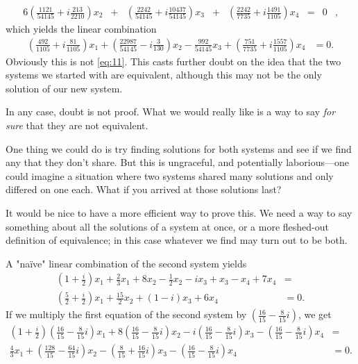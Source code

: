 \documentclass[12pt]{article}
\begin{document}
\begin{enumerate}
\begin{alignat*}{6}
        (\frac{1121}{54145} + i\frac{213}{2210})x_2 & {}+{} &
        (\frac{2242}{54145} + i\frac{10437}{54145})x_3 & {}+{} &
        (\frac{2242}{7735}+i\frac{1491}{1105})x_4 & {}={}  & 0 &,
      \end{alignat*}
      which yields the linear combination
      \begin{align*}
        (\frac{492}{1105} + i\frac{81}{1105})x_1
        + (\frac{22987}{54145} - i\frac{3}{130})x_2
        - \frac{992}{54145}x_3
        + (\frac{751}{7735} + i\frac{1557}{1105})x_4
        &= 0.
      \end{align*}
      Obviously this is not \eqref{eq:11}. This casts further
      doubt on the idea that the two systems we started with are
      equivalent, although this may not be the only solution of
      our new system.

      In any case, doubt is not proof. What we would really like
      is a way to say \textit{for sure} that they are not
      equivalent.

      One thing we could do is try finding solutions for both
      systems and see if we find any that they don't share. But
      this is ungraceful, and potentially laborious—one could
      imagine a situation where two systems shared many solutions
      and only differed on one each. What if you arrived at those
      solutions last?

      It would be nice to have a more efficient way to prove
      this. We need a way to say something about all the
      solutions of a system at once, or a more fleshed-out
      definition of equivalence; in this case whatever we find
      may turn out to be both.

      A "naïve" linear combination of the second system yields
      \begin{align*}
        (1 + \frac{i}{2})x_1 + \frac{2}{3}x_1 + 8x_2 - \frac{1}{2}x_2 - ix_3 + x_3 - x_4 + 7x_4 &=\\
        (\frac{5}{2} + \frac{i}{2})x_1 + \frac{15}{2}x_2 + (1 - i)x_3 + 6x_4 &= 0.
      \end{align*}
      If we multiply the first equation of the second system by
      $(\frac{16}{15} - \frac{8}{15}i)$, we get
      \begin{align*}
        (1 + \frac{i}{2})(\frac{16}{15} - \frac{8}{15}i)x_1 + 8(\frac{16}{15} - \frac{8}{15}i)x_2 - i(\frac{16}{15} - \frac{8}{15}i)x_3 - (\frac{16}{15} - \frac{8}{15}i)x_4 &=\\
        \frac{4}{3}x_1 + (\frac{128}{15} - \frac{64}{15}i)x_2 -
        (\frac{8}{15} + \frac{16}{15}i)x_3 - (\frac{16}{15} -
        \frac{8}{15}i)x_4 &= 0.
      \end{align*}


\end{enumerate}
\end{document}
